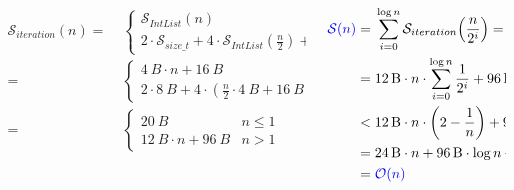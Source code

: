             \begin{frame}{\cwwsortrecursivecostframe}
                \begin{columns}[c]
                    \begin{column}{0.48\textwidth}
                        \tiny
                        \begin{align*}
                            \mathcal{S}_{iteration}{\left(n\right)} = & \; \begin{cases}
                                \mathcal{S}_{IntList}{\left(n\right)} & n \leq 1 \\
                                2 \cdot \mathcal{S}_{size\_t} + 4 \cdot \mathcal{S}_{IntList}{\left(\frac{n}{2}\right)} + \mathcal{S}_{IntList}{\left(n\right)} & n > 1
                            \end{cases} \\
                            = & \; \begin{cases}
                                \SI{4}{B} \cdot n + \SI{16}{B} & n \leq 1 \\
                                2 \cdot \SI{8}{B} + 4 \cdot \left(\frac{n}{2} \cdot \SI{4}{B} + \SI{16}{B}\right) + \left(n \cdot \SI{4}{B} + \SI{16}{B}\right) & n > 1
                            \end{cases} \\
                            = & \; \begin{cases}
                                \SI{20}{B} & n \leq 1 \\
                                \SI{12}{B} \cdot n + \SI{96}{B} & n > 1
                            \end{cases}
                        \end{align*}
                    \end{column}
    
                    \begin{column}{0.48\textwidth}
                        \footnotesize
                        \begin{align*}
                            \textcolor{blue}{\mathcal{S}{\left(n\right)}} = & \; \sum_{i = 0}^{\log{n}}{\mathcal{S}_{iteration}{\left(\frac{n}{2^i}\right)}} = \\
                            = & \; \SI{12}{B} \cdot n \cdot \sum_{i = 0}^{\log{n}}{\frac{1}{2^i}} + \SI{96}{B} \cdot \sum_{i = 0}^{\log{n}}{1} = \\
                            < & \; \SI{12}{B} \cdot n \cdot \left(2 - \frac{1}{n}\right) + \SI{96}{B} \cdot \left(\log{n} + 1\right) = \\
                            = & \; \SI{24}{B} \cdot n + \SI{96}{B} \cdot \log{n} + \SI{84}{B} \\
                            = & \; \textcolor{blue}{\mathcal{O}{\left(n\right)}}
                        \end{align*}
                    \end{column}                
                \end{columns}
            \end{frame}

